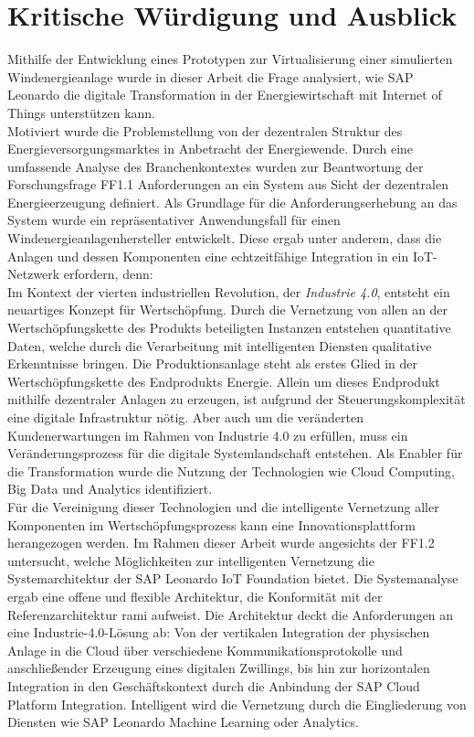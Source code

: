 \section{Kritische Würdigung und Ausblick}

Mithilfe der Entwicklung eines Prototypen zur Virtualisierung einer simulierten Windenergieanlage wurde in dieser Arbeit die Frage analysiert, wie SAP Leonardo die digitale Transformation in der Energiewirtschaft mit Internet of Things unterstützen kann. 
\\Motiviert wurde die Problemstellung von der dezentralen Struktur des Energieversorgungsmarktes in Anbetracht der Energiewende. Durch eine umfassende Analyse des Branchenkontextes wurden zur Beantwortung der Forschungsfrage FF1.1 Anforderungen an ein System aus Sicht der dezentralen Energieerzeugung definiert. Als Grundlage für die Anforderungserhebung an das System wurde ein repräsentativer Anwendungsfall für einen Windenergieanlagenhersteller entwickelt. Diese ergab unter anderem, dass die Anlagen und dessen Komponenten eine echtzeitfähige Integration in ein IoT-Netzwerk erfordern, denn:
\\Im Kontext der vierten industriellen Revolution, der \textit{Industrie 4.0}, entsteht ein neuartiges Konzept für Wertschöpfung. Durch die Vernetzung von allen an der Wertschöpfungskette des Produkts beteiligten Instanzen entstehen quantitative Daten, welche durch die Verarbeitung mit intelligenten Diensten qualitative Erkenntnisse bringen. Die Produktionsanlage steht als erstes Glied in der Wertschöpfungskette des Endprodukts Energie. Allein um dieses Endprodukt mithilfe dezentraler Anlagen zu erzeugen, ist aufgrund der Steuerungskomplexität eine digitale Infrastruktur nötig. Aber auch um die veränderten Kundenerwartungen im Rahmen von Industrie 4.0 zu erfüllen, muss ein Veränderungsprozess für die digitale Systemlandschaft entstehen. Als Enabler für die Transformation wurde die Nutzung der Technologien wie Cloud Computing, Big Data und Analytics identifiziert. 
\\Für die Vereinigung dieser Technologien und die intelligente Vernetzung aller Komponenten im Wertschöpfungsprozess kann eine Innovationsplattform herangezogen werden. Im Rahmen dieser Arbeit wurde angesichts der FF1.2 untersucht, welche Möglichkeiten zur intelligenten Vernetzung die Systemarchitektur der SAP Leonardo IoT Foundation bietet. Die Systemanalyse ergab eine offene und flexible Architektur, die Konformität mit der Referenzarchitektur \ac{rami} aufweist. Die Architektur deckt die Anforderungen an eine Industrie-4.0-Lösung ab: Von der vertikalen Integration der physischen Anlage in die Cloud über verschiedene Kommunikationsprotokolle und anschließender Erzeugung eines digitalen Zwillings, bis hin zur horizontalen Integration in den Geschäftskontext durch die Anbindung der SAP Cloud Platform Integration. Intelligent wird die Vernetzung durch die Eingliederung von Diensten wie SAP Leonardo Machine Learning oder Analytics. 
